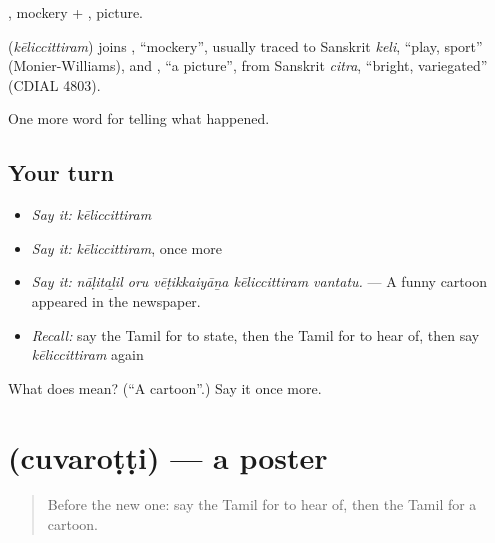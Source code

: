, mockery + , picture.

\begin{cousinweb}
\textbf{} (\emph{kēliccittiram}) joins , \textquotedblleft{}mockery\textquotedblright{}, usually traced to Sanskrit \emph{keli}, \textquotedblleft{}play, sport\textquotedblright{} (Monier-Williams), and , \textquotedblleft{}a picture\textquotedblright{}, from Sanskrit \emph{citra}, \textquotedblleft{}bright, variegated\textquotedblright{} (CDIAL 4803).
\end{cousinweb}

\begin{grammarlens}[title={What you've built}]
One more word for telling what happened.
\end{grammarlens}

\subsection*{Your turn}
\begin{itemize}
\raggedright
  \item \emph{Say it:} \emph{kēliccittiram}
  \item \emph{Say it:} \emph{kēliccittiram}, once more
  \item \emph{Say it:} \emph{nāḷitaḻil oru vēṭikkaiyāṉa kēliccittiram vantatu.} — A funny cartoon appeared in the newspaper.
  \item \emph{Recall:} say the Tamil for to state, then the Tamil for to hear of, then say \emph{kēliccittiram} again
\end{itemize}

\begin{tcolorbox}[breakable,colback=teal!4,colframe=teal!35!black,title={Before you move on}]
What does  mean? (\textquotedblleft{}A cartoon\textquotedblright{}.) Say it once more.
\end{tcolorbox}
\section[\texorpdfstring{\ta{சுவரொட்டி} (cuvaroṭṭi)}{சுவரொட்டி (cuvaroṭṭi)}]{ (cuvaroṭṭi) — a poster}

\label{lesson:TA-C310-cuvarotti}



\begin{quote}
Before the new one: say the Tamil for to hear of, then the Tamil for a cartoon.
\end{quote}

